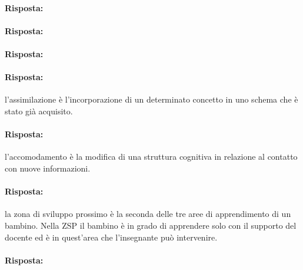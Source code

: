 
\paragraph{Risposta:}


\paragraph{Risposta:}


\paragraph{Risposta:}



\paragraph{Risposta:} l'assimilazione è l'incorporazione di un determinato concetto in uno schema che è stato già acquisito.


\paragraph{Risposta:} l'accomodamento è la modifica di una struttura cognitiva in relazione al contatto con nuove informazioni.


\paragraph{Risposta:} la zona di sviluppo prossimo è la seconda delle tre aree di apprendimento di un bambino. Nella ZSP il bambino è in grado di apprendere solo con il supporto del docente ed è in quest'area che l'insegnante può intervenire.


\paragraph{Risposta:}